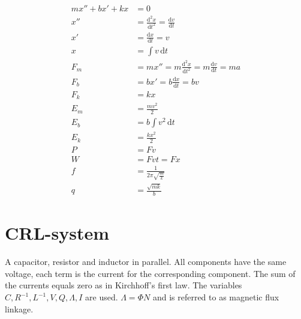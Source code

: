 \documentclass[]{../common/elementary-physics}
\begin{document}
\begin{subequations}
\begin{align}
m x'' + b x' + k x &= 0 \\
x'' &= \frac{\mathrm{d}^2 x}{\mathrm{d}t^2} = \frac{\mathrm{d}v}{\mathrm{d}t} \tag{definition of acceleration} \\
x' &= \frac{\mathrm{d}x}{\mathrm{d}t} = v \tag{definition of velocity} \\
x &= \int v \, \mathrm{d}t \\
F_m &= m x'' = m \frac{\mathrm{d}^2 x}{\mathrm{d}t^2} = m \frac{\mathrm{d}v}{\mathrm{d}t} = m a \tag{Newton's 2nd law} \\
F_b &= b x' = b \frac{\mathrm{d}x}{\mathrm{d}t} = b v \\
F_k &= k x \tag{Hooke's law} \\
E_m &= \frac{m v^2}{2} \tag{kinetic energy} \\
E_b &= b \int v^2 \, \mathrm{d}t \tag{losses} \\
E_k &= \frac{k x^2}{2} \tag{energy in a spring} \\
P &= F v \tag{power} \\
W &= F v t = F x \tag{work} \\
f &= \frac{1}{2 \pi \sqrt{\frac{m}{k}}} \tag{frequency} \\
q &= \frac{\sqrt{m k}}{b} \tag{quality factor}
\end{align}
\end{subequations}

\pagebreak

\section{CRL-system}

A capacitor, resistor and inductor in parallel.
All components have the same voltage, each term is the current for the corresponding component.
The sum of the currents equals zero as in Kirchhoff's first law.
The variables $C,R^{-1},L^{-1},V,Q,\Lambda,I$ are used.
$\Lambda = \Phi N$ and is referred to as magnetic flux linkage.
\end{document}
